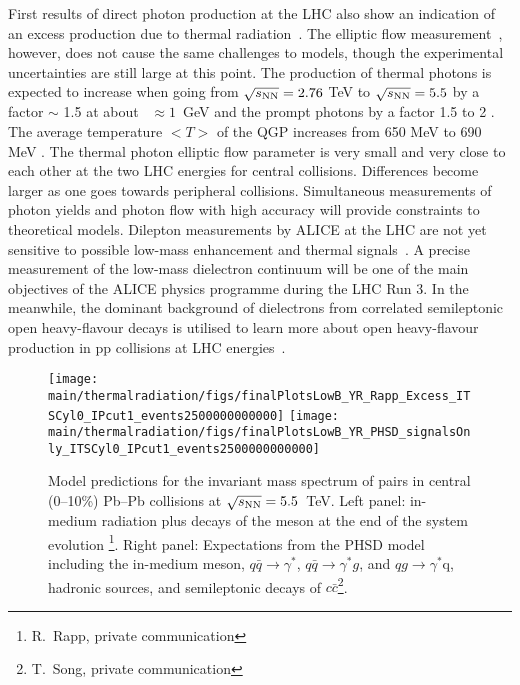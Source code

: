 \documentclass[../report.tex]{subfiles}
\providecommand{\main}{..}
\begin{document}
First results of direct photon production at the LHC also show an indication of an excess production due to thermal radiation~\cite{Adam:2015lda}. The elliptic flow measurement~\cite{Acharya:2018bdy}, however, does not cause the same challenges to models, though the experimental uncertainties are still large at this point. The production of thermal photons 
is expected to increase when going from $\sqrt{s_{\rm NN}} = 2.76$ TeV to $\sqrt{s_{\rm NN}} = 5.5$ by a factor $\sim$ 1.5 at about \pT~$\approx 1$~GeV and the prompt  photons by a factor 1.5 to 2 \cite{Dasgupta:2018pjm}. The average temperature $<T>$ of the QGP increases from 650 MeV to 690 MeV \cite{reference}.
The thermal photon elliptic flow parameter is very small and very close to each other at the two LHC energies for central collisions. Differences become larger as one goes towards peripheral collisions. Simultaneous measurements of photon yields and photon flow with high accuracy will provide constraints to theoretical models.
Dilepton measurements by ALICE at the LHC are not yet sensitive to possible low-mass enhancement and thermal signals~\cite{Acharya:2018nxm}. A precise measurement of the low-mass dielectron continuum will be one of the main objectives of the ALICE physics programme during the LHC Run 3. In the meanwhile, the dominant background of  dielectrons from correlated semileptonic open heavy-flavour decays is utilised to learn more about open heavy-flavour production in pp collisions at LHC energies~\cite{Acharya:2018ohw,Acharya:2018kkj}.


\begin{figure}[htb]
\centering
\texttt{[image: \\main/thermalradiation/figs/finalPlotsLowB\_YR\_Rapp\_Excess\_ITSCyl0\_IPcut1\_events2500000000000]}
\texttt{[image: \\main/thermalradiation/figs/finalPlotsLowB\_YR\_PHSD\_signalsOnly\_ITSCyl0\_IPcut1\_events2500000000000]}
\caption{Model predictions for the invariant mass spectrum of \Pepem pairs in central (0--10\%) Pb--Pb collisions at $\sqrt{s_{\rm NN}} = 5.5$~TeV. Left panel: in-medium radiation plus decays of the \Prho meson at the end of the system evolution \footnote{R.~Rapp, private communication}. Right panel: Expectations from the PHSD model including the in-medium \Prho meson, $q\bar{q}\rightarrow\gamma^{*}$, $q\bar{q}\rightarrow\gamma^{*}g$, and $qg\rightarrow\gamma^{*}$q, hadronic sources, and semileptonic decays of $c\bar{c}$\footnote{T.~Song, private communication}.}
\label{fig:LHCExpectations_Rapp_pHSD}
\end{figure}
\end{document}
